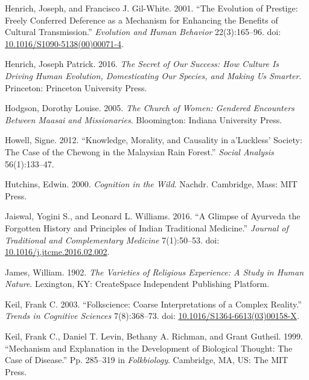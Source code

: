\documentclass[
  11pt,
]{article}
\begin{document}
\leavevmode\hypertarget{ref-henrichEvolutionPrestigeFreely2001}{}%
Henrich, Joseph, and Francisco J. Gil-White. 2001. ``The Evolution of Prestige: Freely Conferred Deference as a Mechanism for Enhancing the Benefits of Cultural Transmission.'' \emph{Evolution and Human Behavior} 22(3):165--96. doi: \href{https://doi.org/10.1016/S1090-5138(00)00071-4}{10.1016/S1090-5138(00)00071-4}.

\leavevmode\hypertarget{ref-henrichSecretOurSuccess2016}{}%
Henrich, Joseph Patrick. 2016. \emph{The Secret of Our Success: How Culture Is Driving Human Evolution, Domesticating Our Species, and Making Us Smarter}. Princeton: Princeton University Press.

\leavevmode\hypertarget{ref-hodgsonChurchWomenGendered2005}{}%
Hodgson, Dorothy Louise. 2005. \emph{The Church of Women: Gendered Encounters Between Maasai and Missionaries}. Bloomington: Indiana University Press.

\leavevmode\hypertarget{ref-howell2012knowledge}{}%
Howell, Signe. 2012. ``Knowledge, Morality, and Causality in a'Luckless' Society: The Case of the Chewong in the Malaysian Rain Forest.'' \emph{Social Analysis} 56(1):133--47.

\leavevmode\hypertarget{ref-hutchinsCognitionWild2000}{}%
Hutchins, Edwin. 2000. \emph{Cognition in the Wild}. Nachdr. Cambridge, Mass: MIT Press.

\leavevmode\hypertarget{ref-jaiswalGlimpseAyurvedaForgotten2016}{}%
Jaiswal, Yogini S., and Leonard L. Williams. 2016. ``A Glimpse of Ayurveda the Forgotten History and Principles of Indian Traditional Medicine.'' \emph{Journal of Traditional and Complementary Medicine} 7(1):50--53. doi: \href{https://doi.org/10.1016/j.jtcme.2016.02.002}{10.1016/j.jtcme.2016.02.002}.

\leavevmode\hypertarget{ref-jamesVarietiesReligiousExperience2009}{}%
James, William. 1902. \emph{The Varieties of Religious Experience: A Study in Human Nature}. Lexington, KY: CreateSpace Independent Publishing Platform.

\leavevmode\hypertarget{ref-keilFolkscienceCoarseInterpretations2003}{}%
Keil, Frank C. 2003. ``Folkscience: Coarse Interpretations of a Complex Reality.'' \emph{Trends in Cognitive Sciences} 7(8):368--73. doi: \href{https://doi.org/10.1016/S1364-6613(03)00158-X}{10.1016/S1364-6613(03)00158-X}.

\leavevmode\hypertarget{ref-keilMechanismExplanationDevelopment1999}{}%
Keil, Frank C., Daniel T. Levin, Bethany A. Richman, and Grant Gutheil. 1999. ``Mechanism and Explanation in the Development of Biological Thought: The Case of Disease.'' Pp. 285--319 in \emph{Folkbiology}. Cambridge, MA, US: The MIT Press.
\end{document}
